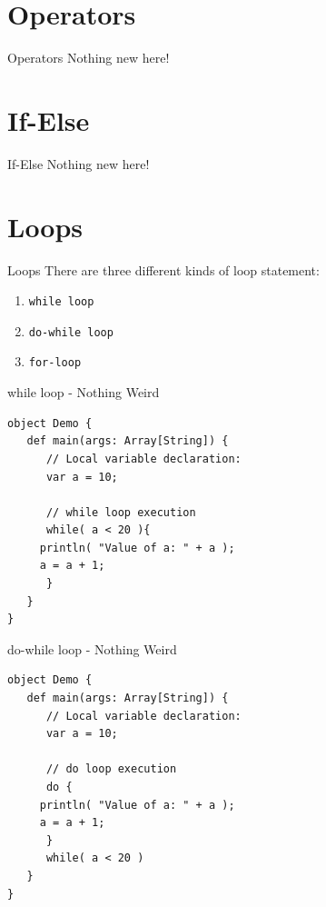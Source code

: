 \documentclass[presentation, aspectratio=169]{beamer}
\begin{document}
\section{Operators}
\label{sec:org9dcab3a}

\begin{frame}[label={sec:org4f6d93d}]{Operators}
Nothing new here!
\end{frame}

\section{If-Else}
\label{sec:org968bd0f}

\begin{frame}[label={sec:org6539837}]{If-Else}
Nothing new here!
\end{frame}

\section{Loops}
\label{sec:org88ca0f1}

\begin{frame}[label={sec:orgf8e2154},fragile]{Loops}
 There are three different kinds of loop statement:
\begin{enumerate}
\item \texttt{while loop}
\item \texttt{do-while loop}
\item \texttt{for-loop}
\end{enumerate}
\end{frame}

\begin{frame}[label={sec:orged486ee},fragile]{while loop - Nothing Weird}
 \begin{verbatim}
object Demo {
   def main(args: Array[String]) {
      // Local variable declaration:
      var a = 10;

      // while loop execution
      while( a < 20 ){
	 println( "Value of a: " + a );
	 a = a + 1;
      }
   }
}
\end{verbatim}
\end{frame}

\begin{frame}[label={sec:org55a21e7},fragile]{do-while loop - Nothing Weird}
 \begin{verbatim}
object Demo {
   def main(args: Array[String]) {
      // Local variable declaration:
      var a = 10;

      // do loop execution
      do {
	 println( "Value of a: " + a );
	 a = a + 1;
      }
      while( a < 20 )
   }
}
\end{verbatim}
\end{frame}
\end{document}
